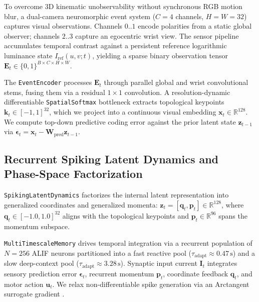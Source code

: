 \documentclass{article}
\begin{document}
To overcome 3D kinematic unobservability without synchronous RGB motion blur, a dual-camera neuromorphic event system ($C = 4$ channels, $H = W = 32$) captures visual observations. Channels $0..1$ encode polarities from a static global observer; channels $2..3$ capture an egocentric wrist view. The sensor pipeline accumulates temporal contrast against a persistent reference logarithmic luminance state $I_{\text{ref}}(u, v; t)$, yielding a sparse binary observation tensor $\mathbf{E}_t \in \{0, 1\}^{B \times C \times H \times W}$.

The \texttt{EventEncoder} processes $\mathbf{E}_t$ through parallel global and wrist convolutional stems, fusing them via a residual $1 \times 1$ convolution. A resolution-dynamic differentiable \texttt{SpatialSoftmax} bottleneck \cite{finn2016spatial} extracts topological keypoints $\mathbf{k}_t \in [-1, 1]^{32}$, which we project into a continuous visual embedding $\mathbf{x}_t \in \mathbb{R}^{128}$. We compute top-down predictive coding error against the prior latent state $\mathbf{z}_{t-1}$ via $\boldsymbol{\epsilon}_t = \mathbf{x}_t - \mathbf{W}_{\text{pred}}\mathbf{z}_{t-1}$.

\begin{table}[t]
\centering
\caption{[INSERT TABLE: Master Tensor Dimensionality Contract Matrix. Include columns for Tensor Symbol ($\mathbf{E}_t, \mathbf{u}_t, \text{flag}_t, \mathbf{k}_t, \mathbf{x}_t, \boldsymbol{\epsilon}_t, \mathbf{s}_t, \mathbf{q}_t, \mathbf{p}_t, \mathbf{z}_t, \hat{\mathbf{y}}_t$), Producing/Consuming Modules, and Exact Shape Contracts verified at runtime.]}\label{tab:tensor_contracts}
\end{table}

\subsection{Recurrent Spiking Latent Dynamics and Phase-Space Factorization}
\texttt{SpikingLatentDynamics} factorizes the internal latent representation into generalized coordinates and generalized momenta: $\mathbf{z}_t = [\mathbf{q}_t, \mathbf{p}_t] \in \mathbb{R}^{128}$, where $\mathbf{q}_t \in [-1.0, 1.0]^{32}$ aligns with the topological keypoints and $\mathbf{p}_t \in \mathbb{R}^{96}$ spans the momentum subspace.

\texttt{MultiTimescaleMemory} drives temporal integration via a recurrent population of $N = 256$ ALIF neurons \cite{bellec2018long, bellec2020solution} partitioned into a fast reactive pool ($\tau_{\text{adapt}} \approx 0.47\,\text{s}$) and a slow deep-context pool ($\tau_{\text{adapt}} \approx 3.28\,\text{s}$). Synaptic input current $\mathbf{I}_t$ integrates sensory prediction error $\boldsymbol{\epsilon}_t$, recurrent momentum $\mathbf{p}_t$, coordinate feedback $\mathbf{q}_t$, and motor action $\mathbf{u}_t$. We relax non-differentiable spike generation via an Arctangent surrogate gradient \cite{neftci2019surrogate}.
\end{document}
